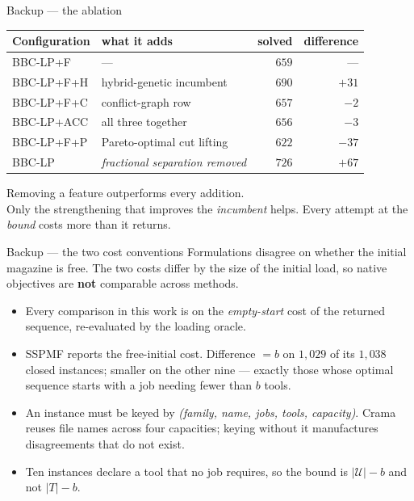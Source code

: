 \documentclass[11pt,aspectratio=169]{beamer}
\newcommand{\U}{\mathcal{U}}
\newcommand{\keyline}[1]{\vspace{0.4em}{\color{cRule}\rule{\textwidth}{0.4pt}}\vspace{0.3em}\par#1}
\begin{document}
\begin{frame}{Backup --- the ablation}
\vspace{0.6em}
\centering
\begin{tabular}{@{}llrr@{}}
\toprule
Configuration & what it adds & solved & difference\\
\midrule
BBC-LP+F   & ---                        & $659$ & ---\\
BBC-LP+F+H & hybrid-genetic incumbent   & $690$ & $+31$\\
BBC-LP+F+C & conflict-graph row         & $657$ & $-2$\\
BBC-LP+ACC & all three together         & $656$ & $-3$\\
BBC-LP+F+P & Pareto-optimal cut lifting & $622$ & $-37$\\
\midrule
BBC-LP     & \emph{fractional separation removed} & $726$ & $+67$\\
\bottomrule
\end{tabular}
\vspace{1.0em}
\keyline{}
\centering
Removing a feature outperforms every addition.\\[0.3em]
{\small Only the strengthening that improves the \emph{incumbent} helps. Every attempt at
the \emph{bound} costs more than it returns.}
\end{frame}

\begin{frame}{Backup --- the two cost conventions}
\vspace{0.6em}
{\small Formulations disagree on whether the initial magazine is free. The two costs
differ by the size of the initial load, so native objectives are \textbf{not} comparable
across methods.}
\vspace{0.8em}
\begin{itemize}\itemsep4pt\small
  \item Every comparison in this work is on the \emph{empty-start} cost of the returned
  sequence, re-evaluated by the loading oracle.
  \item SSPMF reports the free-initial cost. Difference $=b$ on $1{,}029$ of its $1{,}038$
  closed instances; smaller on the other nine --- exactly those whose optimal sequence
  starts with a job needing fewer than $b$ tools.
  \item An instance must be keyed by \emph{(family, name, jobs, tools, capacity)}. Crama
  reuses file names across four capacities; keying without it manufactures disagreements
  that do not exist.
  \item Ten instances declare a tool that no job requires, so the bound is $|\U|-b$ and
  not $|T|-b$.
\end{itemize}
\end{frame}
\end{document}
